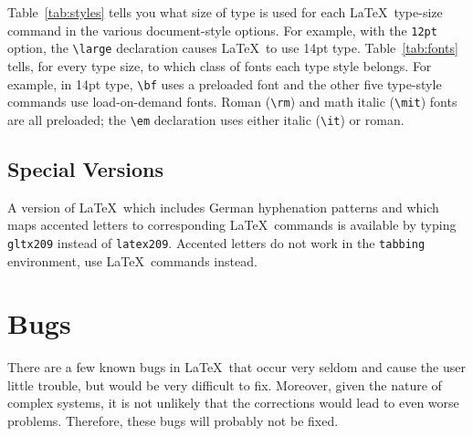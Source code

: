 Table~\ref{tab:styles} tells you what size of type is used for each
\LaTeX\ type-size command in the various document-style options.  For
example, with the {\tt 12pt} option, the \hbox{\verb|\large|}
declaration causes \LaTeX\ to use 14pt type.  Table~\ref{tab:fonts}
tells, for every type size, to which class of fonts each type style
belongs.  For example, in 14pt type, \verb|\bf| uses a preloaded
font and the other five type-style commands use load-on-demand fonts.
Roman (\verb|\rm|) and math italic (\verb|\mit|) fonts are all
preloaded; the \hbox{\verb|\em|} declaration uses either italic
(\verb|\it|) or roman.
 
 
 
 
\subsection{Special Versions}

A version of \LaTeX\ which includes German hyphenation patterns
and which maps accented letters to corresponding \LaTeX\ commands
is available by typing \verb|gltx209| instead of \verb|latex209|.
Accented letters do not work in the \verb|tabbing| environment,
use \LaTeX\ commands instead.
 
 
\section{Bugs}
 
There are a few known bugs in \LaTeX\ that occur very seldom and
cause the user little trouble, but would be very difficult to fix.
Moreover, given the nature of complex systems, it is not unlikely that
the corrections would lead to even worse problems.  Therefore, these
bugs will probably not be fixed.  
 
